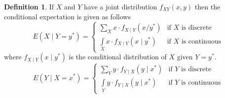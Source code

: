 \documentclass[12pt,a4paper]{report}
\theoremstyle{definition}
\newtheorem{definition}[thm]{Definition}
\theoremstyle{plain}
\theoremstyle{definition}
\begin{document}
\begin{definition}
If $X$ and $Y$  have a joint distribution $f_{XY}(x,y)$ then the conditional expectation is given as follows 
\[E(X\mid Y=y^*)=
\begin{cases}
\sum\limits_Xx\cdot f_{X\mid Y}(x/y^*) & \text{if}\,\, X\,\,\text{is discrete}\\[1ex]
\int\limits_Xx\cdot f_{X\mid Y}(x\mid y^*)& \text{if}\,\, X \,\,\text{is continuous}
\end{cases}
\]
where $f_{X\mid Y}(x\mid y^*)$ is the conditional distribution of $X$ given $Y=y^*$.
\[E(Y\mid X=x^*)=
\begin{cases}
\sum\limits_Yy\cdot f_{Y\mid X}(y\mid x^*) & \text{if}\,\, Y \,\,\text{is discrete}\\[1ex]
\int\limits_Yy\cdot f_{Y\mid X}(y\mid x^*) & \text{if}\,\, Y\,\, \text{is continuous}
\end{cases}
\]
\end{definition}
\end{document}

